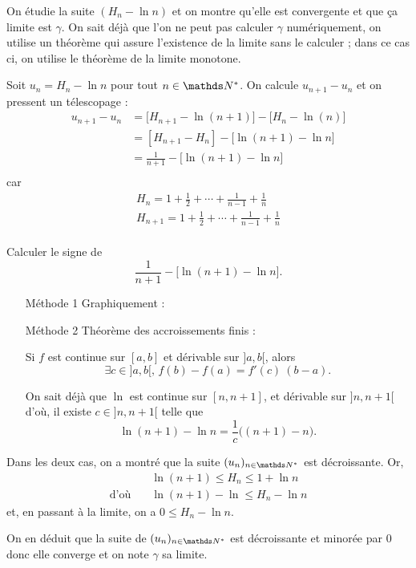 \begin{exo}
	On étudie la suite $(H_n - \ln n)$\/ et on montre qu'elle est convergente et que ça limite est $\gamma$. On sait déjà que l'on ne peut pas calculer $\gamma$\/ numériquement, on utilise un théorème qui assure l'existence de la limite sans le calculer ; dans ce cas ci, on utilise le théorème de la limite monotone.
	
	Soit $u_n = H_n - \ln n$\/ pour tout $n \in \N^*$. On calcule $u_{n+1}-u_n$\/ et on pressent un télescopage :
	\begin{align*}
		u_{n+1} - u_n &= \big[H_{n+1} - \ln(n+1)\big] - \big[H_n - \ln(n) \big] \\
		&= [H_{n+1} - H_n] - \big[\ln(n+1) - \ln n \big] \\
		&= \frac{1}{n+1} - \big[\ln(n+1) - \ln n \big] \\
	\end{align*} car
	\begin{gather*}
		H_n = 1 + \frac{1}{2} + \cdots + \frac{1}{n-1} + \frac{1}{n}\\
		H_{n+1} = 1 + \frac{1}{2} + \cdots + \frac{1}{n-1} + \frac{1}{n}\\
	\end{gather*}

	Calculer le signe de \[
		\frac{1}{n+1} - \big[\ln(n+1) - \ln n\big]
	.\]

	\begin{enumerate}
		\item[\sc Méthode 1] Graphiquement : 
		\item[\sc Méthode 2] Théorème des accroissements finis :
			\begin{rap}
			Si $f$\/ est continue sur $[a,b]$\/ et dérivable sur $]a,b[$, alors \[
				\exists c \in {]a,b[},\, f(b)- f(a) = f'(c)\:(b-a)
			.\]
			\end{rap}

			On sait déjà que $\ln$\/ est continue sur $[n, n+1]$, et dérivable sur $]n, n+1[$\/ d'où, il existe $c \in {]n,n+1[}$\/ telle que  \[
				\ln(n+1) - \ln n = \frac{1}{c} \big((n+1) - n\big)
			.\]
	\end{enumerate}

	Dans les deux cas, on a montré que la suite $(u_n)_{n\in\N^*}$\/ est décroissante.
	Or,
	\begin{align*}
		&\ln(n+1) \le H_n \le 1 + \ln n\\
		\text{d'où}\quad&\ln(n+1) - \ln \le H_n - \ln n
	\end{align*}
	et, en passant à la limite, on a $0 \le H_n - \ln n$.

	On en déduit que la suite de $(u_n)_{n\in\N^*}$\/ est décroissante et minorée par $0$\/ donc elle converge et on note $\gamma$\/ sa limite.
\end{exo}

